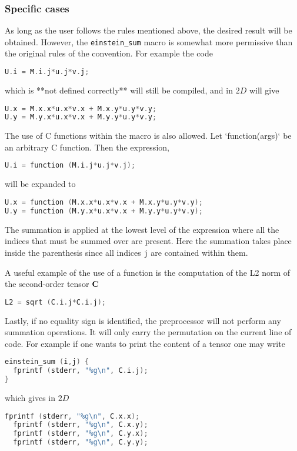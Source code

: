 \subsubsection{Specific cases}

As long as the user follows the rules mentioned above, the desired result will be obtained. 
However, the \texttt{einstein\_sum} macro is somewhat more permissive than the original rules of the convention. 
For example the code
\begin{lstlisting}[language=C]
U.i = M.i.j*u.j*v.j;
\end{lstlisting}
which is **not defined correctly** will still be compiled, and in $2D$ will give
\begin{lstlisting}[language=C]
U.x = M.x.x*u.x*v.x + M.x.y*u.y*v.y;
U.y = M.y.x*u.x*v.x + M.y.y*u.y*v.y;
\end{lstlisting}
The use of C functions within the macro is also allowed. 
Let `function(args)` be an arbitrary C function. 
Then the expression, 
\begin{lstlisting}[language=C]
U.i = function (M.i.j*u.j*v.j);
\end{lstlisting}
will be expanded to
\begin{lstlisting}[language=C]
U.x = function (M.x.x*u.x*v.x + M.x.y*u.y*v.y);
U.y = function (M.y.x*u.x*v.x + M.y.y*u.y*v.y);
\end{lstlisting}

The summation is applied at the lowest level of the expression where all the indices that must be summed over are present. 
Here the summation takes place inside the parenthesis since all indices \texttt{j} are contained within them. 

A useful example of the use of a function is the computation of the L2 norm of the second-order tensor $\textbf C$
\begin{lstlisting}[language=C]
L2 = sqrt (C.i.j*C.i.j);
\end{lstlisting}
Lastly, if no equality sign is identified, the preprocessor will not perform any summation operations. It will only carry the permutation on the current line of code. For example if one wants to print the content of a tensor one may write 
\begin{lstlisting}[language=C]
einstein_sum (i,j) {
  fprintf (stderr, "%g\n", C.i.j);
}
\end{lstlisting}
which gives in $2D$
\begin{lstlisting}[language=C]
  fprintf (stderr, "%g\n", C.x.x);
  fprintf (stderr, "%g\n", C.x.y);
  fprintf (stderr, "%g\n", C.y.x);
  fprintf (stderr, "%g\n", C.y.y);
\end{lstlisting}


